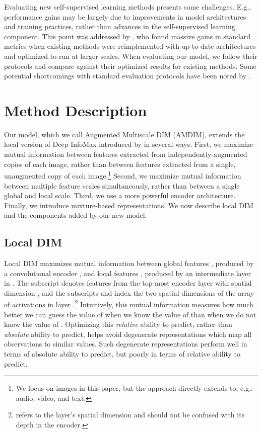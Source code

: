 \documentclass{article}
\begin{document}
Evaluating new self-supervised learning methods presents some challenges. E.g., performance gains may be largely due to improvements in model architectures and training practices, rather than advances in the self-supervised learning component. This point was addressed by \cite{Kolesnikov2019}, who found massive gains in standard metrics when existing methods were reimplemented with up-to-date architectures and optimized to run at larger scales. When evaluating our model, we follow their protocols and compare against their optimized results for existing methods.
Some potential shortcomings with standard evaluation protocols have been noted by \cite{Goyal2019}.


% 
\section{Method Description}
\label{sec:method}
Our model, which we call Augmented Multiscale DIM (AMDIM), extends the local version of Deep InfoMax introduced by \citet{Hjelm2019} in several ways.
First, we maximize mutual information between features extracted from independently-augmented copies of each image, rather than between features extracted from a single, unaugmented copy of each image.\footnote{We focus on images in this paper, but the approach directly extends to, e.g.: audio, video, and text.}
Second, we maximize mutual information between multiple feature scales simultaneously, rather than between a single global and local scale.
Third, we use a more powerful encoder architecture. Finally, we introduce mixture-based representations. We now describe local DIM and the components added by our new model.

\subsection{Local DIM}
Local DIM maximizes mutual information between global features , produced by a convolutional encoder , and local features  , produced by an intermediate layer in .
The subscript  denotes features from the top-most encoder layer with spatial dimension , and the subscripts  and  index the two spatial dimensions of the  array of activations in layer .\footnote{ refers to the layer's spatial dimension and should not be confused with its depth in the encoder.}
Intuitively, this mutual information measures how much better we can guess the value of  when we know the value of  than when we do not know the value of . 
Optimizing this \emph{relative} ability to predict, rather than \emph{absolute} ability to predict, helps avoid degenerate representations which map all observations to similar values. 
Such degenerate representations perform well in terms of absolute ability to predict, but poorly in terms of relative ability to predict.
\end{document}
